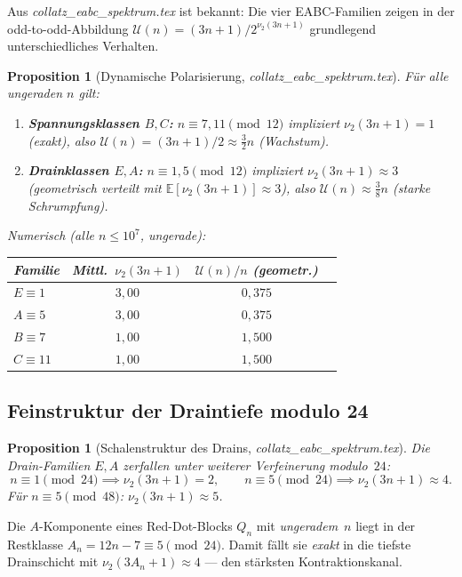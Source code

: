\documentclass[12pt,a4paper]{article}
\newtheorem{proposition}[definition]{Proposition}
\newcommand{\vii}{\nu_2}
\newcommand{\U}{\mathcal{U}}
\newcommand{\E}{\mathbb{E}}
\begin{document}
Aus \textit{collatz\_eabc\_spektrum.tex} ist bekannt: Die vier EABC-Familien
zeigen in der odd-to-odd-Abbildung $\U(n) = (3n+1)/2^{\vii(3n+1)}$
grundlegend unterschiedliches Verhalten.

\begin{proposition}[Dynamische Polarisierung, \textit{collatz\_eabc\_spektrum.tex}]
\label{prop:polarisierung}
Für alle ungeraden $n$ gilt:
\begin{enumerate}[label=\upshape(\roman*)]
  \item \textbf{Spannungsklassen $B,C$:}
    $n \equiv 7,11 \pmod{12}$ impliziert $\vii(3n+1) = 1$ (exakt),
    also $\U(n) = (3n+1)/2 \approx \tfrac{3}{2}n$ (Wachstum).
  \item \textbf{Drainklassen $E,A$:}
    $n \equiv 1,5 \pmod{12}$ impliziert $\vii(3n+1) \approx 3$
    (geometrisch verteilt mit $\E[\vii(3n+1)] \approx 3$),
    also $\U(n) \approx \tfrac{3}{8}n$ (starke Schrumpfung).
\end{enumerate}
Numerisch (alle $n \leq 10^7$, ungerade):
\begin{center}
\begin{tabular}{lccc}
\toprule
Familie & Mittl.\ $\vii(3n+1)$ & $\U(n)/n$ (geometr.) \\
\midrule
$E \equiv 1$ & $3{,}00$ & $0{,}375$ \\
$A \equiv 5$ & $3{,}00$ & $0{,}375$ \\
$B \equiv 7$ & $1{,}00$ & $1{,}500$ \\
$C \equiv 11$ & $1{,}00$ & $1{,}500$ \\
\bottomrule
\end{tabular}
\end{center}
\end{proposition}

\subsection{Feinstruktur der Draintiefe modulo 24}

\begin{proposition}[Schalenstruktur des Drains, \textit{collatz\_eabc\_spektrum.tex}]
\label{prop:schalenstruktur}
Die Drain-Familien $E, A$ zerfallen unter weiterer Verfeinerung modulo~$24$:
\[
  n \equiv 1 \pmod{24} \implies \vii(3n+1) = 2,
  \qquad
  n \equiv 5 \pmod{24} \implies \vii(3n+1) \approx 4.
\]
Für $n \equiv 5 \pmod{48}$: $\vii(3n+1) \approx 5$.
\end{proposition}

\begin{tcolorbox}[kernidee, title={Schlüsselbeobachtung für Red Dots}]
Die $A$-Komponente eines Red-Dot-Blocks $Q_n$ mit \emph{ungeradem}~$n$
liegt in der Restklasse $A_n = 12n-7 \equiv 5 \pmod{24}$.
Damit fällt sie \emph{exakt} in die tiefste Drainschicht mit
$\vii(3A_n+1) \approx 4$ --- den stärksten Kontraktionskanal.
\end{tcolorbox}
\end{document}
